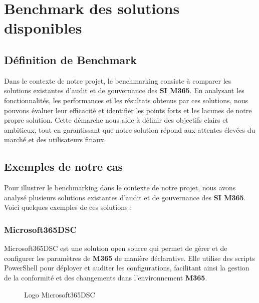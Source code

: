 \section{Benchmark des solutions disponibles}
\subsection{Définition de Benchmark}

Dans le contexte de notre projet, le benchmarking consiste à comparer les solutions existantes d'audit et de gouvernance des \textbf{SI M365}. En analysant les fonctionnalités, les performances et les résultats obtenus par ces solutions, nous pouvons évaluer leur efficacité et identifier les points forts et les lacunes de notre propre solution. Cette démarche nous aide à définir des objectifs clairs et ambitieux, tout en garantissant que notre solution répond aux attentes élevées du marché et des utilisateurs finaux.

\subsection{Exemples de notre cas}

Pour illustrer le benchmarking dans le contexte de notre projet, nous avons analysé plusieurs solutions existantes d'audit et de gouvernance des \textbf{SI M365}. Voici quelques exemples de ces solutions :

\subsubsection{Microsoft365DSC}

Microsoft365DSC est une solution open source qui permet de gérer et de configurer les paramètres de \textbf{M365} de manière déclarative. Elle utilise des scripts PowerShell pour déployer et auditer les configurations, facilitant ainsi la gestion de la conformité et des changements dans l'environnement \textbf{M365}.

\begin{figure}[H]
    \begin{center}
        \caption{Logo Microsoft365DSC}
    \end{center}
\end{figure}
\vspace{-0.4cm}
